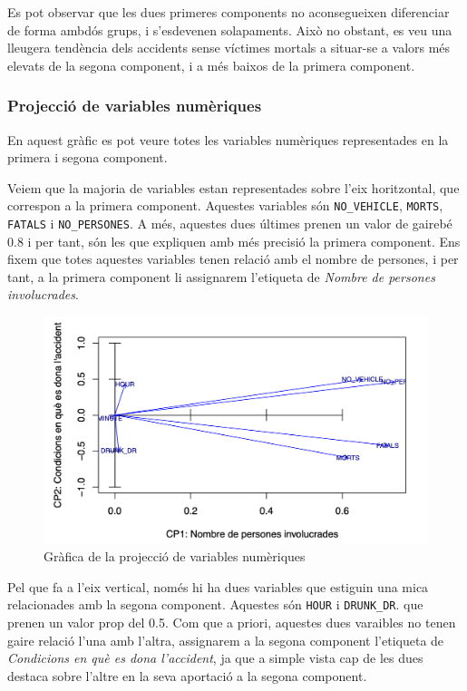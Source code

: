 \documentclass[11pt,longbibliography]{article}
\theoremstyle{definition}
\theoremstyle{remark}
\begin{document}
Es pot observar que les dues primeres components no aconsegueixen diferenciar de forma ambdós grups, i s'esdevenen solapaments. Això no obstant, es veu una lleugera tendència dels accidents sense víctimes mortals a situar-se a valors més elevats de la segona component, i a més baixos de la primera component. 

\subsubsection{Projecció de variables numèriques}

En aquest gràfic es pot veure totes les variables numèriques representades en la primera i segona component.


Veiem que la majoria de variables estan representades sobre l’eix horitzontal, que correspon
a la primera component. Aquestes variables són \texttt{NO\_VEHICLE}, \texttt{MORTS}, \texttt{FATALS} i \texttt{NO\_PERSONES}. A més, aquestes dues últimes prenen un valor de gairebé 0.8 i per tant, són les que expliquen amb més precisió la primera component. Ens fixem que totes aquestes variables tenen relació amb el nombre de persones, i per tant, a la primera component li assignarem l’etiqueta de \emph{Nombre de persones involucrades}.

\begin{figure}[H]
\begin{center}
\includegraphics[width=12cm]{acp4}
\end{center}
\caption{Gràfica de la projecció de variables numèriques}
\label{fig:ACP4}
\end{figure}


Pel que fa a l’eix vertical, només hi ha dues variables que estiguin una mica relacionades amb la segona component. Aquestes són \texttt{HOUR} i \texttt{DRUNK\_DR}. que prenen un valor prop del 0.5. Com que a priori, aquestes dues varaibles no tenen gaire relació l'una amb l'altra, assignarem a la segona component l'etiqueta de \emph{Condicions en què es dona l'accident}, ja que a simple vista cap de les dues destaca sobre l'altre en la seva aportació a la segona component.
\end{document}

